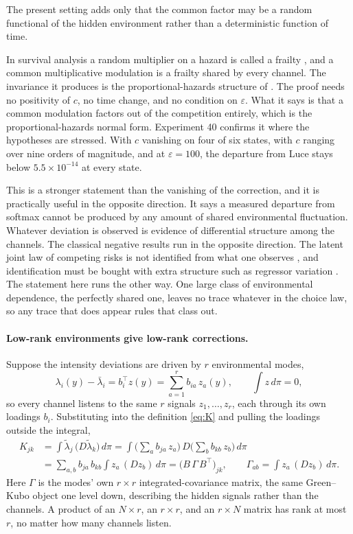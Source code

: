\documentclass[11pt]{article}
\theoremstyle{remark}
\newcommand{\lbar}{\bar{\lambda}}
\begin{document}
The present setting adds only that the common factor may be a random
functional of the hidden environment rather than a deterministic function of
time.

In survival analysis a random multiplier on a hazard is called a frailty
\citep{vaupel1979}, and a common multiplicative modulation is a frailty
shared by every channel. The invariance it produces is the proportional-hazards structure
of \citet{cox1972}. The proof needs no positivity of $c$, no time
change, and no condition on $\varepsilon$. What it says is that a common modulation factors out of the
competition entirely, which is the proportional-hazards normal form. Experiment
40 confirms it where the hypotheses are stressed. With $c$ vanishing on four of
six states, with $c$ ranging over nine orders of magnitude, and at
$\varepsilon = 100$, the departure from Luce stays below $5.5\times10^{-14}$ at every
state.

This is a stronger statement than the vanishing of the correction, and it is
practically useful in the opposite direction. It says a measured departure from
softmax cannot be produced by any amount of shared environmental fluctuation.
Whatever deviation is observed is evidence of differential structure among the
channels. The classical negative results run in the opposite direction. The
latent joint law of competing risks is not identified from what one observes
\citep{tsiatis1975}, and identification must be bought with extra structure
such as regressor variation \citep{heckman1989}. The statement here runs the
other way. One large class of environmental dependence, the perfectly shared
one, leaves no trace whatever in the choice law, so any trace that does appear
rules that class out.

\paragraph{Low-rank environments give low-rank corrections.} Suppose the
intensity deviations are driven by $r$ environmental modes,
\[
  \lambda_i(y) - \lbar_i = b_i^\top z(y)
  = \sum_{a=1}^{r} b_{ia}\, z_a(y),
  \qquad \int z \, d\pi = 0 ,
\]
so every channel listens to the same $r$ signals $z_1, \dots, z_r$, each
through its own loadings $b_i$. Substituting into the definition \eqref{eq:K}
and pulling the loadings outside the integral,
\begin{align*}
  K_{jk}
  &= \int \tilde\lambda_j \, \big(D \tilde\lambda_k\big)\, d\pi
   = \int \Big(\sum_{a} b_{ja}\, z_a\Big)\,
     D\Big(\sum_{b} b_{kb}\, z_b\Big)\, d\pi \\
  &= \sum_{a,b} b_{ja}\, b_{kb} \int z_a \, (D z_b)\, d\pi
   = \big(B\, \Gamma\, B^\top\big)_{jk},
  \qquad \Gamma_{ab} = \int z_a \, (D z_b)\, d\pi .
\end{align*}
Here $\Gamma$ is the modes' own $r \times r$ integrated-covariance matrix,
the same Green--Kubo object one level down, describing the hidden signals
rather than the channels. A product of an $N \times r$, an $r \times r$, and
an $r \times N$ matrix has rank at most $r$, no matter how many channels
listen.
\end{document}
